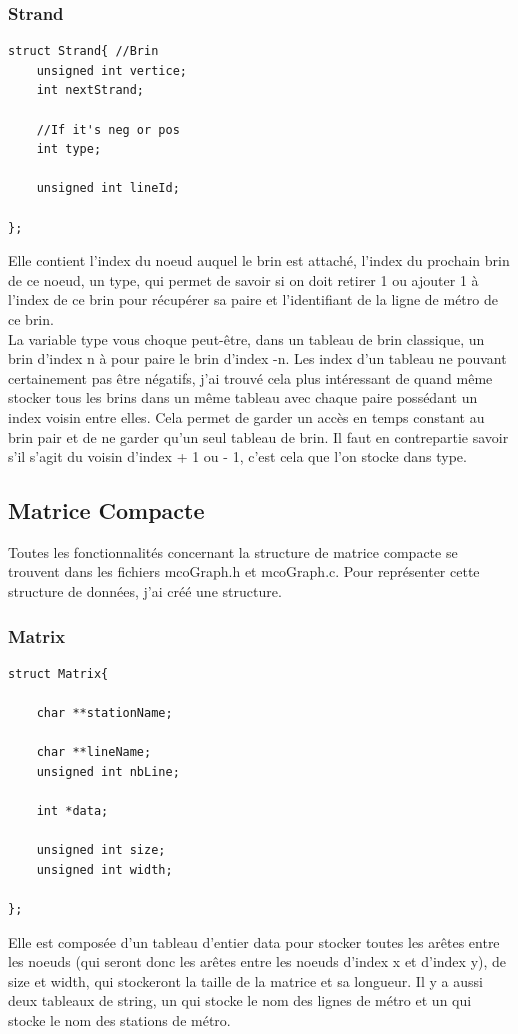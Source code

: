 \documentclass[11pt]{article}
\begin{document}
\subsubsection{Strand}
\begin{lstlisting}
struct Strand{ //Brin
	unsigned int vertice;
	int nextStrand;
	
	//If it's neg or pos
	int type;

	unsigned int lineId;

};
\end{lstlisting}
Elle contient l'index du noeud auquel le brin est attaché, l'index du prochain brin de ce noeud, un type, qui permet de savoir si on doit retirer 1 ou ajouter 1 à l'index de ce brin pour récupérer sa paire et l'identifiant de la ligne de métro de ce brin.\\
La variable type vous choque peut-être, dans un tableau de brin classique, un brin d'index n à pour paire le brin d'index -n. Les index d'un tableau ne pouvant certainement pas être négatifs, j'ai trouvé cela plus intéressant de quand même stocker tous les brins dans un même tableau avec chaque paire possédant un index voisin entre elles. Cela permet de garder un accès en temps constant au brin pair et de ne garder qu'un seul tableau de brin. Il faut en contrepartie savoir s'il s'agit du voisin d'index + 1 ou - 1, c'est cela que l'on stocke dans type.\\
\subsection{Matrice Compacte}
Toutes les fonctionnalités concernant la structure de matrice compacte se trouvent dans les fichiers mcoGraph.h et mcoGraph.c.
Pour représenter cette structure de données, j'ai créé une structure.
\subsubsection{Matrix}
\begin{lstlisting}
struct Matrix{

	char **stationName;

	char **lineName;
	unsigned int nbLine;

	int *data;

	unsigned int size;
	unsigned int width;

};
\end{lstlisting}
Elle est composée d'un tableau d'entier data pour stocker toutes les arêtes entre les noeuds (qui seront donc les arêtes entre les noeuds d'index x et d'index y), de size et width, qui stockeront la taille de la matrice et sa longueur. Il y a aussi deux tableaux de string, un qui stocke le nom des lignes de métro et un qui stocke le nom des stations de métro.\\
\end{document}
